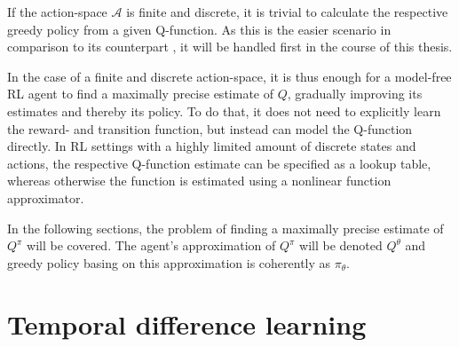 If the action-space $\mathcal{A}$ is finite and discrete, it is trivial to calculate the respective greedy policy from a given Q-function. As this is the easier scenario in comparison to its counterpart , it will be handled first in the course of this thesis.

In the case of a finite and discrete action-space, it is thus enough for a model-free RL agent to find a maximally precise estimate of $Q$, gradually improving its estimates and thereby its policy. To do that, it does not need to explicitly learn the reward- and transition function, but instead can model the Q-function directly. In RL settings with a highly limited amount of discrete states and actions, the respective Q-function estimate can be specified as a lookup table, whereas otherwise the function is estimated using a nonlinear function approximator.

In the following sections, the problem of finding a maximally precise estimate of $Q^\pi$ will be covered. The agent's approximation of $Q^\pi$ will be denoted $Q^\theta$ and greedy policy basing on this approximation is coherently as $\pi_{\theta}$.
\section{Temporal difference learning}



